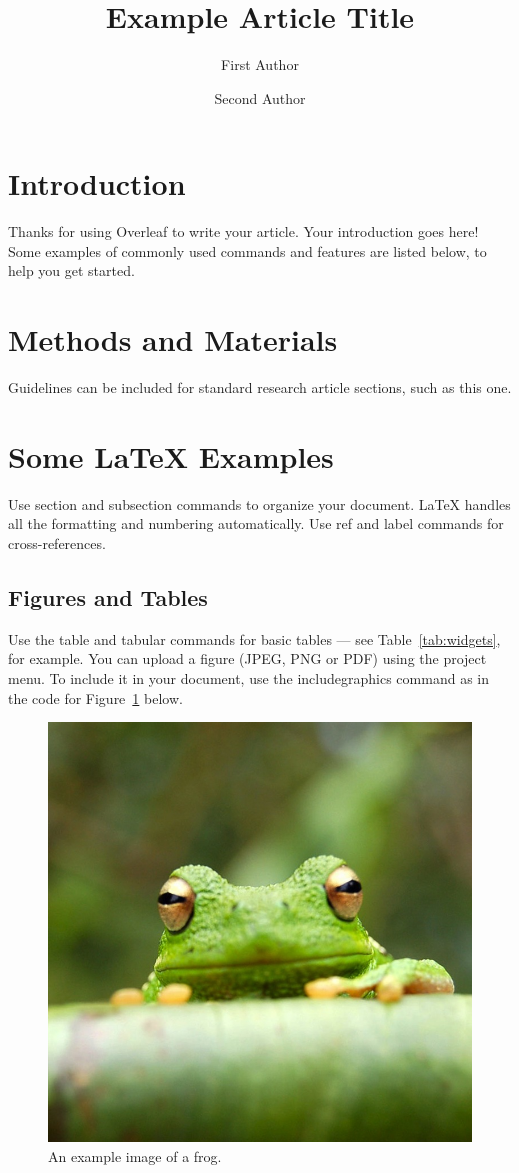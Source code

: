 \documentclass[fleqn,10pt]{olplainarticle}
\title{Example Article Title}
\author[1]{First Author}
\author[2]{Second Author}
\affil[1]{Address of first author}
\affil[2]{Address of second author}
\begin{document}
	
	\flushbottom
	\maketitle
	\thispagestyle{empty}
	
	\section*{Introduction}
	
	Thanks for using Overleaf to write your article. Your introduction goes here! Some examples of commonly used commands and features are listed below, to help you get started.
	
	\section*{Methods and Materials}
	
	Guidelines can be included for standard research article sections, such as this one.
	
	\section*{Some \LaTeX{} Examples}
	\label{sec:examples}
	
	Use section and subsection commands to organize your document. \LaTeX{} handles all the formatting and numbering automatically. Use ref and label commands for cross-references.
	
	\subsection*{Figures and Tables}
	
	Use the table and tabular commands for basic tables --- see Table~\ref{tab:widgets}, for example. You can upload a figure (JPEG, PNG or PDF) using the project menu. To include it in your document, use the includegraphics command as in the code for Figure~\ref{fig:view} below.
	
	\begin{figure}[ht]
		\centering
		\includegraphics[width=0.7\linewidth]{frog}
		\caption{An example image of a frog.}
		\label{fig:view}
	\end{figure}
	
\end{document}
